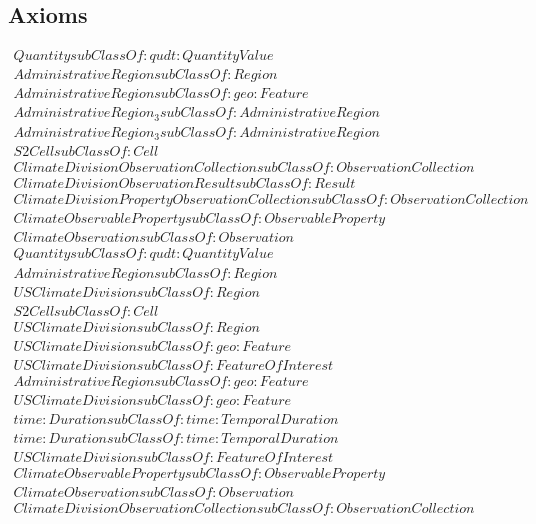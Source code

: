 \subsection{Axioms}
\begin{align}
  Quantity subClassOf: qudt:QuantityValue\\
  AdministrativeRegion subClassOf: Region\\
  AdministrativeRegion subClassOf: geo:Feature\\
  AdministrativeRegion_3 subClassOf: AdministrativeRegion\\
  AdministrativeRegion_3 subClassOf: AdministrativeRegion\\
  S2Cell subClassOf: Cell\\
  ClimateDivisionObservationCollection subClassOf: ObservationCollection\\
  ClimateDivisionObservationResult subClassOf: Result\\
  ClimateDivisionPropertyObservationCollection subClassOf: ObservationCollection\\
  ClimateObservableProperty subClassOf: ObservableProperty\\
  ClimateObservation subClassOf: Observation\\
  Quantity subClassOf: qudt:QuantityValue\\
  AdministrativeRegion subClassOf: Region\\
  USClimateDivision subClassOf: Region\\
  S2Cell subClassOf: Cell\\
  USClimateDivision subClassOf: Region\\
  USClimateDivision subClassOf: geo:Feature\\
  USClimateDivision subClassOf: FeatureOfInterest\\
  AdministrativeRegion subClassOf: geo:Feature\\
  USClimateDivision subClassOf: geo:Feature\\
  time:Duration subClassOf: time:TemporalDuration\\
  time:Duration subClassOf: time:TemporalDuration\\
  USClimateDivision subClassOf: FeatureOfInterest\\
  ClimateObservableProperty subClassOf: ObservableProperty\\
  ClimateObservation subClassOf: Observation\\
  ClimateDivisionObservationCollection subClassOf: ObservationCollection\\

\end{align}
